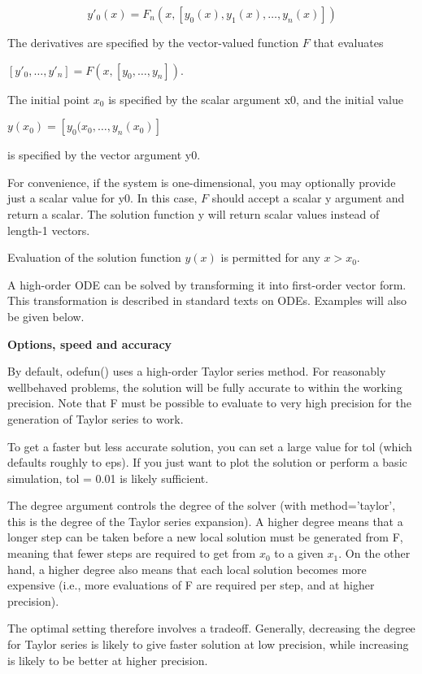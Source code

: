\begin{equation}
y'_0(x) = F_n(x,[y_0(x),y_1(x),\ldots,y_n(x)])
\end{equation}


The derivatives are specified by the vector-valued function $F$ that evaluates 

$[y'_0,\ldots,y'_n] = F(x,[y_0,\ldots,y_n])$. 

The initial point $x_0$ is specified by the scalar argument x0, and the initial value 

$y(x_0)=[y_0(x_0,\ldots,y_n(x_0)]$ 

is specified by the vector argument y0.

\vpara
For convenience, if the system is one-dimensional, you may optionally provide just a scalar value for y0. In this case, $F$ should accept a scalar y argument and return a scalar. The solution function y will return scalar values instead of length-1 vectors.

\vpara
Evaluation of the solution function $y(x)$ is permitted for any $x>x_0$.

\vpara
A high-order ODE can be solved by transforming it into first-order vector form. This transformation is described in standard texts on ODEs. Examples will also be given below.

\vpara
\textbf{Options, speed and accuracy}

By default, odefun() uses a high-order Taylor series method. For reasonably wellbehaved problems, the solution will be fully accurate to within the working precision. Note that F must be possible to evaluate to very high precision for the generation of Taylor series to work.

\vpara
To get a faster but less accurate solution, you can set a large value for tol (which defaults roughly to eps). If you just want to plot the solution or perform a basic simulation, tol = 0.01 is likely sufficient.

\vpara
The degree argument controls the degree of the solver (with method=’taylor’, this is the degree of the Taylor series expansion). A higher degree means that a longer step can be taken before a new local solution must be generated from F, meaning that fewer steps are required to get from $x_0$ to a given $x_1$. On the other hand, a higher degree also means that each local solution becomes more expensive (i.e., more evaluations of F are required per step, and at higher precision).

\vpara
The optimal setting therefore involves a tradeoff. Generally, decreasing the degree for Taylor series is likely to give faster solution at low precision, while increasing is likely to be better at higher precision.

